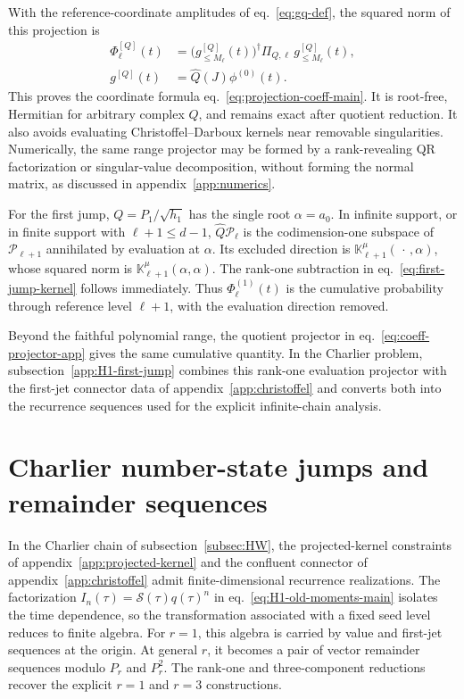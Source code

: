\documentclass[a4paper,11pt]{article}
\def\Jac{J}%
\theoremstyle{definition}
\theoremstyle{remark}
\newcommand{\cP}{\mathcal P}
\newcommand{\Jac}{\mathsf J}
\newcommand{\Qhat}{\widehat Q}
\newcommand{\cS}{\mathcal S}
\begin{document}
With the reference-coordinate amplitudes of
eq.~\eqref{eq:gq-def}, the squared norm of this projection is
\begin{equation}
\begin{aligned}
   \Phi_\ell^{[Q]}(t)
   &=
   \bigl(g_{\le M_\ell}^{[Q]}(t)\bigr)^\dagger
   \Pi_{Q,\ell}\,
   g_{\le M_\ell}^{[Q]}(t),\\
   g^{[Q]}(t)
   &=\Qhat(\Jac)\phi^{(0)}(t).
\end{aligned}
   \label{eq:coeff-cumulative-app}
\end{equation}
This proves the coordinate formula
eq.~\eqref{eq:projection-coeff-main}.  It is root-free, Hermitian for
arbitrary complex $Q$, and remains exact after quotient reduction.  It
also avoids evaluating Christoffel--Darboux kernels near removable
singularities.  Numerically, the same range projector may be formed by a
rank-revealing QR factorization or singular-value decomposition, without
forming the normal matrix, as discussed in appendix~\ref{app:numerics}.

For the first jump, $Q=P_1/\sqrt{h_1}$ has the single root
$\alpha=a_0$.  In infinite support, or in finite support with
$\ell+1\le d-1$, $\Qhat\cP_\ell$ is the codimension-one subspace of
$\cP_{\ell+1}$ annihilated by evaluation at $\alpha$.  Its excluded
direction is $\mathbb K_{\ell+1}^{\mu}(\,\cdot\,,\alpha)$, whose squared norm is
$\mathbb K_{\ell+1}^{\mu}(\alpha,\alpha)$.  The rank-one subtraction in
eq.~\eqref{eq:first-jump-kernel} follows immediately. Thus $\Phi_\ell^{(1)}(t)$ is the cumulative probability through reference
level $\ell+1$, with the evaluation direction removed.

Beyond the faithful polynomial range, the quotient projector in
eq.~\eqref{eq:coeff-projector-app} gives the same cumulative quantity.
In the Charlier problem, subsection~\ref{app:H1-first-jump} combines this rank-one
evaluation projector with the first-jet connector data of
appendix~\ref{app:christoffel} and converts both into the recurrence
sequences used for the explicit infinite-chain analysis.

\section{Charlier number-state jumps and remainder sequences}
\label{app:H1}

In the Charlier chain of subsection~\ref{subsec:HW}, the projected-kernel constraints of appendix~\ref{app:projected-kernel} and the confluent connector of appendix~\ref{app:christoffel} admit finite-dimensional recurrence realizations. The factorization $I_n(\tau)=\cS(\tau)q(\tau)^n$ in eq.~\eqref{eq:H1-old-moments-main} isolates the time dependence, so the transformation associated with a fixed seed level reduces to finite algebra. For $r=1$, this algebra is carried by value and first-jet sequences at the origin. At general $r$, it becomes a pair of vector remainder sequences modulo $P_r$ and $P_r^2$. The rank-one and three-component reductions recover the explicit $r=1$ and
$r=3$ constructions. 
\end{document}
